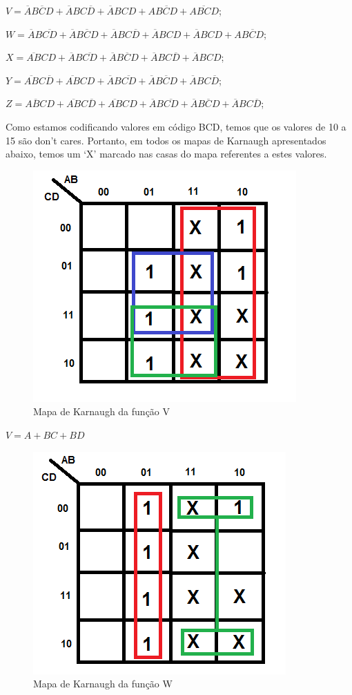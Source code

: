 \documentclass[12pt]{article}
\begin{document}
$V= \overline{A}B\overline{C}D + \overline{A}BC\overline{D} + \overline{A}BCD + A\overline{BCD} + A\overline{BC}D$;

$W= \overline{A}B\overline{C D} + \overline{A}B\overline{C}D + \overline{A}BC\overline{D}  + \overline{A}BCD + \overline{A}BCD + A\overline{BCD}$;

$X = \overline{AB}CD + \overline{A}B\overline{C D} + \overline{A}B\overline{C}D + \overline{A}BC\overline{D} + \overline{A}BCD$;

$Y = \overline{A B}C\overline{D}+ \overline{A B}CD + \overline{A}B\overline{CD} + \overline{A}B\overline{C}D + \overline{A}BC\overline{D} $;

$Z = \overline{A B C}D + \overline{A B}C\overline{D}+ \overline{A B}CD + \overline{A}B\overline{C D} + \overline{A}B\overline{C}D + \overline{A}BC\overline{D} $;

Como estamos codificando valores em código BCD, temos que os valores de 10 a 15 são don’t cares. Portanto, em todos os mapas de Karnaugh apresentados abaixo, temos um ‘X’ marcado nas casas do mapa referentes a estes valores.

\begin{figure}[H]
	\centering
	\includegraphics[width=.5\textwidth]{mapakarnaughv.png}
	\caption{Mapa de Karnaugh da função V}
	\label{fig:karnaughv}
\end{figure}

$ V = A + BC + BD$

\begin{figure}[H]
	\centering
	\includegraphics[width=.5\textwidth]{mapakarnaughw.png}
	\caption{Mapa de Karnaugh da função W}
	\label{fig:karnaughw}
\end{figure}
\end{document}

